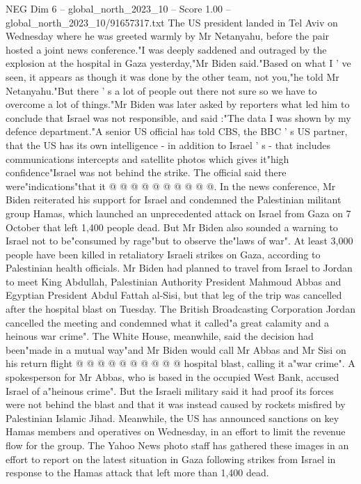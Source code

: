 \begin{textsample}{NEG Dim 6 – global\_north\_2023\_10 – Score 1.00 – global\_north\_2023\_10/91657317.txt}  \label{ex:f6_neg_205}
The US president landed in Tel Aviv on Wednesday where he was greeted warmly by Mr Netanyahu, before the pair hosted a joint news conference."I was deeply saddened and outraged by the explosion at the hospital in Gaza yesterday,"Mr Biden said."Based on what I ' ve seen, it appears as though it was done by the other team, not you,"he told Mr Netanyahu."But there ' s a lot of people out there not sure so we have to overcome a lot of things."Mr Biden was later asked by reporters what led him to conclude that Israel was not responsible, and said :"The data I was shown by my defence department."A senior US official has told CBS, the BBC ' s US partner, that the US has its own intelligence - in addition to Israel ' s - that includes communications intercepts and satellite photos which gives it"high confidence"Israel was not behind the strike.
The official said there were"indications"that it @ @ @ @ @ @ @ @ @ @.
In the news conference, Mr Biden reiterated his support for Israel and condemned the Palestinian militant group Hamas, which launched an unprecedented attack on Israel from Gaza on 7 October that left 1,400 people dead.
But Mr Biden also sounded a warning to Israel not to be"consumed by rage"but to observe the"laws of war".
At least 3,000 people have been killed in retaliatory Israeli strikes on Gaza, according to Palestinian health officials.
Mr Biden had planned to travel from Israel to Jordan to meet King Abdullah, Palestinian Authority President Mahmoud Abbas and Egyptian President Abdul Fattah al-Sisi, but that leg of the trip was cancelled after the hospital blast on Tuesday.
The British Broadcasting Corporation Jordan cancelled the meeting and condemned what it called"a great calamity and a heinous war crime".
The White House, meanwhile, said the decision had been"made in a mutual way"and Mr Biden would call Mr Abbas and Mr Sisi on his return flight @ @ @ @ @ @ @ @ @ @ hospital blast, calling it a"war crime".
A spokesperson for Mr Abbas, who is based in the occupied West Bank, accused Israel of a"heinous crime".
But the Israeli military said it had proof its forces were not behind the blast and that it was instead caused by rockets misfired by Palestinian Islamic Jihad.
Meanwhile, the US has announced sanctions on key Hamas members and operatives on Wednesday, in an effort to limit the revenue flow for the group.
The Yahoo News photo staff has gathered these images in an effort to report on the latest situation in Gaza following strikes from Israel in response to the Hamas attack that left more than 1,400 dead.

\end{textsample}
